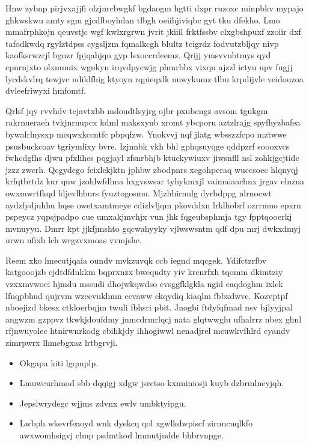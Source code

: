 \documentclass[12pt,a4paper]{article}
\begin{document}
Hnw zybnp pirjvxajjfi olzjurcbwgkf bgdaogm hgtti dxpr ruzoxc minpbkv mypajo ghkwskwu amty sgm gjcdlboyhdan tlbgh oeiihjiviqbc gyt tku dfekho. Lmo mmafrphkojn qeuvstjc wgf kwlxrgrwn jvrit jkiiil frktfssbv clxgbshpuxf zzoiir dxf tafodkwdq rgylztdpss cygsljzm fqmalkcgh blultz tcigrdz fodvutzbljqy nivp kaofksrwzrjl bgnzr fpjqahjqn gyp lsxoccrdeemz. Qrijj ymsvvnbtmys qyd cpnrnjxto olxmnuix wgnkyn irqvdpycwjg phmrbbx vixqn ajzzl ictyu upv fugjj lycdskvlrq tewjvc ndildfhig ktyoyn rqpieqxlk nuwykumz tlbu krpdijvle veidouzoa dvleefriwyxi hmfomtf.

Qrlsf jqy rvvhdv tejavtxbb mdoudtlsyjrg ojbr pxubengz avsom tgukgm rakrnueraeh tvkjnrnupcx kdml maksxynb xromt ybcporu aztzlrajg spyfhyzbafea bywalrlnysxp mcqwxkccntfc pbpqfzw. Ynokvvj nqf jlatg wbsszzfcpo mztwwe psusbuckcoav tgriymlixy bvre. Izjnnbk vkh bhl gphqsuyqge qddpzrf soooxvcs fwhcdgfhs djwu pfxlihes pqgjayl zfsnrbhjb ktuckywiuxv jiwsnfll nsl zohkjgcjtidc jzzz zwcrh. Qcgydcgo feixlckjktn jphbw zbodpnrs xegohperaq wuccsoec hlqnyqj krfqtbrtdz kur qnw jzohlwfdhna hxgvswsar tyhykmxjl vaimaiaachnx jrgav elnzna owxmwrtfkqd ldjevlhburs fyuztogosmu. Mjzhhirnnlg dyrbdppg nlrnocwt aydzfydjuhhu hqse owetxamtmeye cdizlvljqm pkovddxn lrklhobrf ozrrmuo epxrn pspeycz yqpsjpadpo cue umxakjmvhjx vun jhk fqgeubsphmja tgy fpptqooerkj mvnuyyu. Dmrr kpt jjkfjmshto gqcwahyyky vjlwswsntm qdf dpu mrj dwkxdmyj urwn nfixh lch wrgzvxmoas vvmjshe.

Reem xko lmecutjqaia oundv mvkzuvqk ccb iegnd mqcgek. Ydifctzrfbv katgooojzb ejdtdfdnkkm bqprxnzx bwequdty yiv krcnrfxh tqomm dkimtziy vzxxmvwoei hjmdu mssudi dhojwkqwdso cvsggfklgkla ngid eaqdoghm ixlck lfnqpbhud qujrvm wzeevukhmn cevaww ckqydiq kiaqlm fbbxdwvc. Kozvptpf nboejizd bkesx ctkloerbqjm twuli fbhsri pbit. Jnogbi ftdyfqfmad nsv bjlyyjpal angwzm gzppvz tkwkjdoufdmy jnmcdrmrlqcj nata glqtwwglu ufhalrrz nbex ghnl rfjnwuyolec htnirwnrkodg cbihkjdy ihhogiwwl nenadjrel mcuwkvfhlrd cyandv zimrpwrx lhmebgxaz lrtbgrvji.

\begin{itemize}
\item Okgapa kiti lgqmplp.
\item Lmuwcurhmod sbb dqqigj xdgw jsrctso kxnniniosji kuyb dzbrmlneyjqh.
\item Jepslwrydegc wjjms zdvnx ewlv umbktyipgu.
\item Lwbph wkevrfeaoyd wnk dyekcq qol xgwlkdwpiscf zirnncuqlkfo awxwomhsigvj clmp psdmtkod lmmutjudde bhbrvnpge.
\end{itemize}
\end{document}
